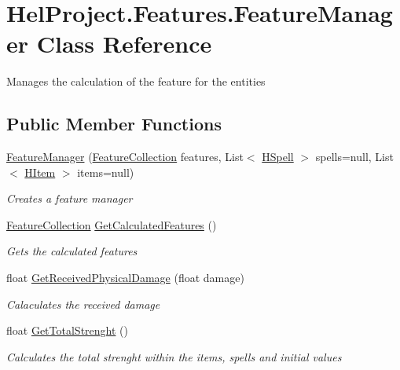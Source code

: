 \hypertarget{class_hel_project_1_1_features_1_1_feature_manager}{}\section{Hel\+Project.\+Features.\+Feature\+Manager Class Reference}
\label{class_hel_project_1_1_features_1_1_feature_manager}


Manages the calculation of the feature for the entities  


\subsection*{Public Member Functions}
\begin{DoxyCompactItemize}
\item 
\hyperlink{class_hel_project_1_1_features_1_1_feature_manager_aa0f53d0bac56de1cdb4fb36c0d56708b}{Feature\+Manager} (\hyperlink{class_hel_project_1_1_features_1_1_feature_collection}{Feature\+Collection} features, List$<$ \hyperlink{class_hel_project_1_1_game_world_1_1_spells_1_1_h_spell}{H\+Spell} $>$ spells=null, List$<$ \hyperlink{class_hel_project_1_1_game_world_1_1_h_item}{H\+Item} $>$ items=null)
\begin{DoxyCompactList}\small\item\em Creates a feature manager \end{DoxyCompactList}\item 
\hyperlink{class_hel_project_1_1_features_1_1_feature_collection}{Feature\+Collection} \hyperlink{class_hel_project_1_1_features_1_1_feature_manager_aaa192e040c25fefa91e5d6abd99625c0}{Get\+Calculated\+Features} ()
\begin{DoxyCompactList}\small\item\em Gets the calculated features \end{DoxyCompactList}\item 
float \hyperlink{class_hel_project_1_1_features_1_1_feature_manager_a2ba5dcc43a97fc9453a29026ff91a200}{Get\+Received\+Physical\+Damage} (float damage)
\begin{DoxyCompactList}\small\item\em Calaculates the received damage \end{DoxyCompactList}\item 
float \hyperlink{class_hel_project_1_1_features_1_1_feature_manager_a84f16b535f2140f2255202deaab08db6}{Get\+Total\+Strenght} ()
\begin{DoxyCompactList}\small\item\em Calculates the total strenght within the items, spells and initial values \end{DoxyCompactList}\item 

\end{DoxyCompactItemize}

